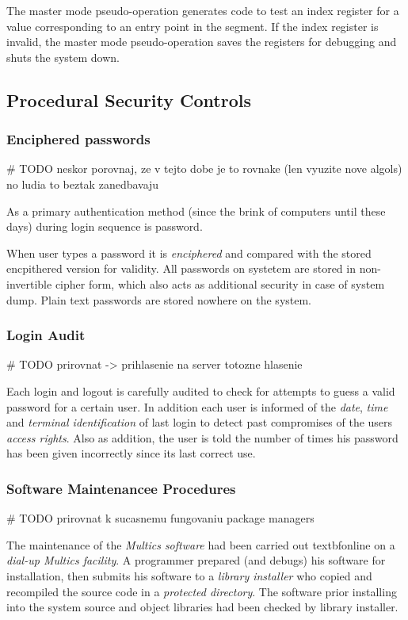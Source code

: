  The master mode pseudo-operation generates code to test an index register for a value corresponding to an 
 entry point in the segment. If the index register is invalid, the master mode pseudo-operation saves the
 registers for debugging and shuts the system down.

 
 \subsection{Procedural Security Controls}

 \subsubsection{Enciphered passwords}
# TODO neskor porovnaj, ze v tejto dobe je to rovnake (len vyuzite nove algols) no ludia to beztak zanedbavaju

As a primary authentication method (since the brink of computers until these days) during login sequence 
is password.

When user types a password it is \textit{enciphered} and compared with the stored encpithered version for validity.
All passwords on systetem are stored in non-invertible cipher form, which also acts as additional security in case 
of system dump. Plain text passwords are stored nowhere on the system.

\subsubsection{Login Audit}
# TODO prirovnat -> prihlasenie na server totozne hlasenie

Each login and logout is carefully audited to check for attempts to guess a valid password for a certain user.
In addition each user is informed of the \textit{date}, \textit{time} and \textit{terminal identification} of last
login to detect past compromises of the users \textit{access rights}.
Also as addition, the user is told the number of times his password has been given incorrectly since its 
last correct use. 

\subsubsection{Software Maintenancee Procedures}
# TODO prirovnat k sucasnemu fungovaniu package managers

The maintenance of the \textit{Multics software} had been carried out textbf{online} on a \textit{dial-up 
Multics facility}. A programmer prepared (and debugs) his software for installation, then submits his
software to a \textit{library installer} who copied and recompiled the source code in a \textit{protected 
directory}. 
The software prior installing into the system source and object libraries had been checked by library installer.

